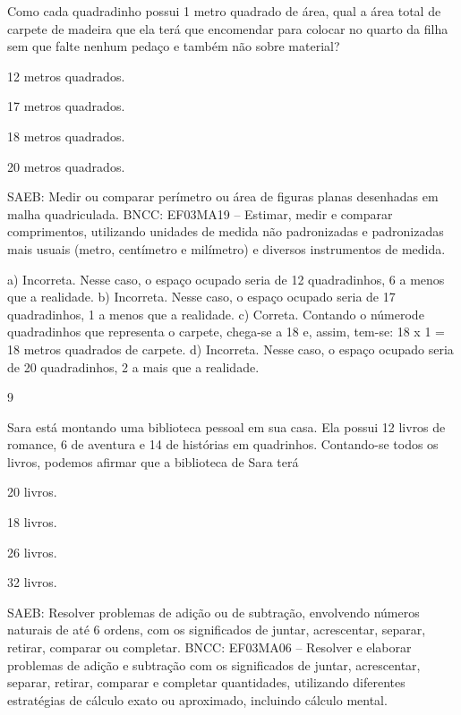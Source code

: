 \begin{multicols}{2}
\begin{enumerate}
{Como cada quadradinho possui 1 metro quadrado de área, qual a área total de carpete de madeira que ela terá que encomendar para colocar no quarto da filha sem que falte nenhum pedaço e também não sobre material?

\begin{escolha}
\item
  12 metros quadrados.
\item
  17 metros quadrados.
\item
  18 metros quadrados.
\item
  20 metros quadrados.
\end{escolha}

SAEB: Medir ou comparar perímetro ou área de figuras planas desenhadas em malha quadriculada.
BNCC: EF03MA19 -- Estimar, medir e comparar comprimentos, utilizando unidades de medida
não padronizadas e padronizadas mais usuais (metro, centímetro e milímetro) e diversos
instrumentos de medida.

a) Incorreta. Nesse caso, o espaço ocupado seria de 12 quadradinhos, 6 a menos que a realidade.
b) Incorreta. Nesse caso, o espaço ocupado seria de 17 quadradinhos, 1 a menos que a realidade.
c) Correta. Contando o númerode quadradinhos que representa o carpete, chega-se a 18 e,
assim, tem-se: 18 x 1 = 18 metros quadrados de carpete.
d) Incorreta. Nesse caso, o espaço ocupado seria de 20 quadradinhos, 2 a mais que a realidade.

\num{9}

Sara está montando uma biblioteca pessoal em sua casa. Ela possui 12 livros de romance, 6 de aventura e 14 de histórias em quadrinhos. Contando-se todos os livros, podemos afirmar que a biblioteca de Sara terá

\begin{escolha}
\item
  20 livros.
\item
  18 livros.
\item
  26 livros.
\item
  32 livros.
\end{escolha}

SAEB: Resolver problemas de adição ou de subtração,
envolvendo números naturais de até 6 ordens, com os significados de juntar, acrescentar, separar, retirar, comparar ou completar.
BNCC: EF03MA06 – Resolver e elaborar problemas de adição e subtração com os significados de
juntar, acrescentar, separar, retirar, comparar e completar quantidades, utilizando diferentes
estratégias de cálculo exato ou aproximado, incluindo cálculo mental.

}
\end{enumerate}
\end{multicols}

